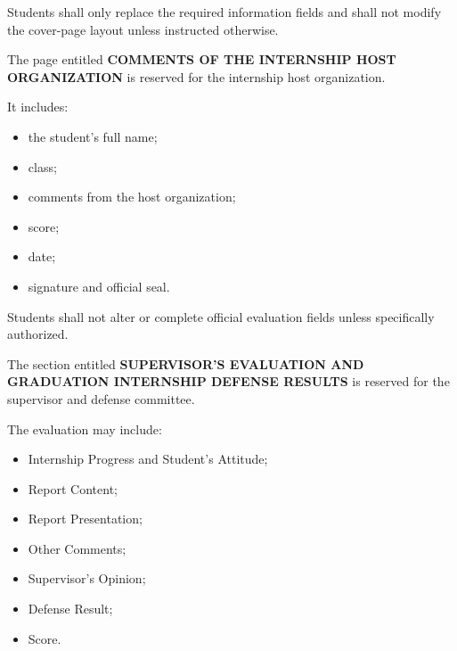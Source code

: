 {Students shall only replace the required information fields and shall not
modify the cover-page layout unless instructed otherwise.

\vspace{0.3cm}


\noindent
{}

\vspace{0.15cm}

The page entitled \textbf{COMMENTS OF THE INTERNSHIP HOST ORGANIZATION}
is reserved for the internship host organization.

It includes:

\begin{itemize}[leftmargin=0.8cm, itemsep=2pt]
    \item the student's full name;
    \item class;
    \item comments from the host organization;
    \item score;
    \item date;
    \item signature and official seal.
\end{itemize}

Students shall not alter or complete official evaluation fields unless
specifically authorized.

\vspace{0.3cm}


\noindent
{}

\vspace{0.15cm}

The section entitled
\textbf{SUPERVISOR'S EVALUATION AND GRADUATION INTERNSHIP DEFENSE RESULTS}
is reserved for the supervisor and defense committee.

The evaluation may include:

\begin{itemize}[leftmargin=0.8cm, itemsep=2pt]
    \item Internship Progress and Student's Attitude;
    \item Report Content;
    \item Report Presentation;
    \item Other Comments;
    \item Supervisor's Opinion;
    \item Defense Result;
    \item Score.
\end{itemize}

}
